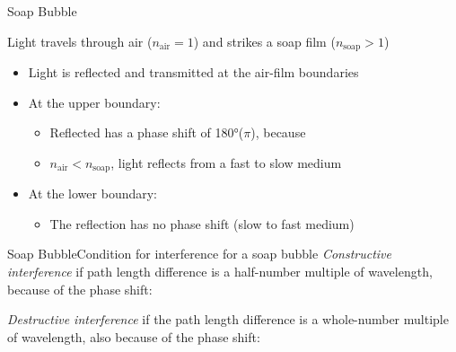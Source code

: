 \documentclass[compress,aspectratio=169]{beamer}
\newcommand{\eq}[2]{\vspace{#1}{\LARGE\begin{displaymath}#2\end{displaymath}}}
\begin{document}
\begin{frame}{Soap Bubble}
  \begin{center}
  \end{center}
  Light travels through air ($n_\mathrm{air}=1$) and strikes a soap film
  ($n_\mathrm{soap}>1$)
  \begin{itemize}
  \item Light is reflected and transmitted at the air-film boundaries
  \item At the upper boundary:
    \begin{itemize}
    \item Reflected has a phase shift of \ang{180}($\pi$), because
    \item $n_\mathrm{air}<n_\mathrm{soap}$, light reflects from a fast to slow
      medium
    \end{itemize}
  \item At the lower boundary:
    \begin{itemize}
    \item The reflection has no phase shift (slow to fast medium)
    \end{itemize}
  \end{itemize}
\end{frame}

\begin{frame}{Soap Bubble}{Condition for interference for a soap bubble}
  \emph{Constructive interference} if path length difference is a half-number
  multiple of wavelength, because of the phase shift:
   
  \eq{-.22in}{\boxed{
      2dn_\mathrm{soap}\cos\theta_2=\left(m-{\frac{1}{2}}\right)\lambda
    }
  }

  \emph{Destructive interference} if the path length difference is a
  whole-number multiple of wavelength, also because of the phase shift:
    
  \eq{-.27in}{
    \boxed{2dn_\mathrm{soap}\cos\theta_2=m\lambda}
  }
\end{frame}
\end{document}
